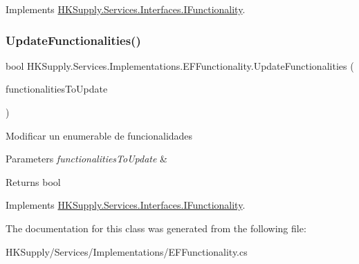Implements \mbox{\hyperlink{interface_h_k_supply_1_1_services_1_1_interfaces_1_1_i_functionality}{H\+K\+Supply.\+Services.\+Interfaces.\+I\+Functionality}}.

\mbox{\label{class_h_k_supply_1_1_services_1_1_implementations_1_1_e_f_functionality_a2093874e195260c8963796b45aeba022}} 
\subsubsection{\texorpdfstring{Update\+Functionalities()}{UpdateFunctionalities()}}
{\footnotesize\ttfamily bool H\+K\+Supply.\+Services.\+Implementations.\+E\+F\+Functionality.\+Update\+Functionalities (\begin{DoxyParamCaption}\item[{I\+Enumerable$<$ \mbox{\hyperlink{class_h_k_supply_1_1_models_1_1_functionality}{Functionality}} $>$}]{functionalities\+To\+Update }\end{DoxyParamCaption})}



Modificar un enumerable de funcionalidades 


\begin{DoxyParams}{Parameters}
{\em functionalities\+To\+Update} & \\
\hline
\end{DoxyParams}
\begin{DoxyReturn}{Returns}
bool
\end{DoxyReturn}


Implements \mbox{\hyperlink{interface_h_k_supply_1_1_services_1_1_interfaces_1_1_i_functionality}{H\+K\+Supply.\+Services.\+Interfaces.\+I\+Functionality}}.



The documentation for this class was generated from the following file\+:\begin{DoxyCompactItemize}
\item 
H\+K\+Supply/\+Services/\+Implementations/E\+F\+Functionality.\+cs\end{DoxyCompactItemize}
